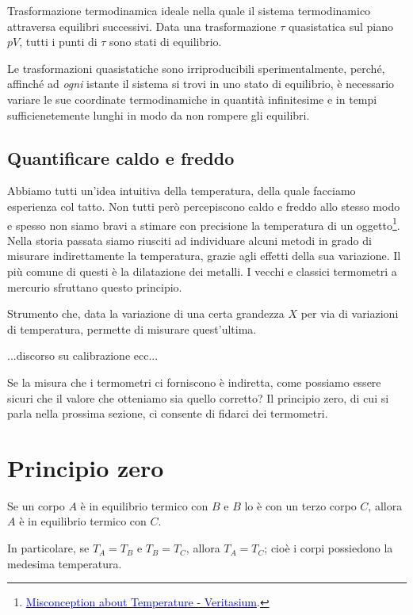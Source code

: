 \begin{tcolorbox}[colback = yellow!30, colframe = yellow!30!black, title = {Trasformazione quasistatica}]
    Trasformazione termodinamica ideale nella quale il sistema termodinamico
    attraversa equilibri successivi. Data una trasformazione $\tau$ quasistatica
    sul piano $pV$, tutti i punti di $\tau$ sono stati di equilibrio.
\end{tcolorbox}

\noindent Le trasformazioni quasistatiche sono irriproducibili sperimentalmente,
perché, affinché ad \textit{ogni} istante il sistema si trovi in uno stato
di equilibrio, è necessario variare le sue coordinate termodinamiche in
quantità infinitesime e in tempi sufficienetemente lunghi in modo da non
rompere gli equilibri.



\subsection{Quantificare caldo e freddo}
Abbiamo tutti un'idea intuitiva della temperatura, della quale facciamo
esperienza col tatto. Non tutti però percepiscono caldo e freddo allo
stesso modo e spesso non siamo bravi a stimare con precisione la
temperatura di un oggetto\footnote{\href{https://www.youtube.com/watch?v=vqDbMEdLiCs}{\textcolor{blue}{Misconception about Temperature - Veritasium}}.}.
Nella storia passata siamo riusciti ad individuare alcuni metodi in
grado di misurare indirettamente la temperatura, grazie agli effetti
della sua variazione. Il più comune di questi è la dilatazione dei
metalli. I vecchi e classici termometri a mercurio sfruttano questo
principio.

\begin{tcolorbox}[colback = yellow!30, colframe = yellow!30!black, title = {Termometro}]
Strumento che, data la variazione di una certa grandezza $X$ per
via di variazioni di temperatura, permette di misurare quest'ultima.
\end{tcolorbox}

...discorso su calibrazione ecc...

Se la misura che i termometri ci forniscono è indiretta, come possiamo
essere sicuri che il valore che otteniamo sia quello corretto? Il
principio zero, di cui si parla nella prossima sezione, ci consente di fidarci dei termometri.


\section{Principio zero}
\begin{tcolorbox}[colback = red!30, colframe = red!30!black, title = {Primo zero della termodinamica}]
Se un corpo $A$ è in equilibrio termico con $B$ e $B$ lo è con un terzo
corpo $C$, allora $A$ è in equilibrio termico con $C$.

In particolare, se $T_A = T_B$ e $T_B = T_C$, allora $T_A = T_C$; cioè
i corpi possiedono la medesima temperatura.
\end{tcolorbox}

